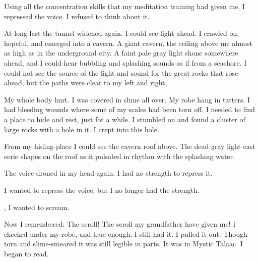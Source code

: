 \documentclass
  [a4paper,
   12pt,
   oneside
  ]%
  {article}
\begin{document}
Using all the concentration skills that my meditation training had given me, I repressed the voice. 
I refused to think about it. 




At long last the tunnel widened again. 
I could see light ahead. 
I crawled on, hopeful, and emerged into a cavern. 
A giant cavern, the ceiling above me almost as high as in the underground city. 
A faint pale gray light shone somewhere ahead, and I could hear bubbling and splashing sounds as if from a seashore. 
I could not see the source of the light and sound for the great rocks that rose ahead, but the paths were clear to my left and right. 

My whole body hurt. 
I was covered in slime all over. 
My robe hang in tatters. 
I had bleeding wounds where some of my scales had been torn off. 
I needed to find a place to hide and rest, just for a while.
I stumbled on and found a cluster of large rocks with a hole in it.
I crept into this hole. 

From my hiding-place I could see the cavern roof above. 
The dead gray light cast eerie shapes on the roof as it pulsated in rhythm with the splashing water. 

The voice droned in my head again. 
I had no strength to repress it. 


I wanted to repress the voice, but I no longer had the strength.


, I wanted to scream. 




Now I remembered: 
The scroll! 
The scroll my grandfather have given me!
I checked under my robe, and true enough, I still had it. 
I pulled it out. 
Though torn and slime-smeared it was still legible in parts. 
It was in Mystic Talaac. 
I began to read. 
\end{document}
